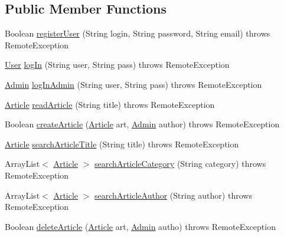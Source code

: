 \subsection*{Public Member Functions}
\begin{DoxyCompactItemize}
\item 
Boolean \hyperlink{interfacees_1_1deusto_1_1server_1_1_i_server_a3b0fbbc1c934b8e527ecfed69e497155}{register\+User} (String login, String password, String email)  throws Remote\+Exception
\item 
\hyperlink{classes_1_1deusto_1_1server_1_1jdo_1_1_user}{User} \hyperlink{interfacees_1_1deusto_1_1server_1_1_i_server_ae6b27c8714c2e2eadc9a55bccb0543fc}{log\+In} (String user, String pass)  throws Remote\+Exception
\item 
\hyperlink{classes_1_1deusto_1_1server_1_1jdo_1_1_admin}{Admin} \hyperlink{interfacees_1_1deusto_1_1server_1_1_i_server_a65588c309522410e6a6d9c27d80821a7}{log\+In\+Admin} (String user, String pass)  throws Remote\+Exception
\item 
\hyperlink{classes_1_1deusto_1_1server_1_1jdo_1_1_article}{Article} \hyperlink{interfacees_1_1deusto_1_1server_1_1_i_server_a1f02a5aa0628909b5464141923f5d1d2}{read\+Article} (String title)  throws Remote\+Exception
\item 
Boolean \hyperlink{interfacees_1_1deusto_1_1server_1_1_i_server_a74b3203c5a8d94e91004df0dc84ca386}{create\+Article} (\hyperlink{classes_1_1deusto_1_1server_1_1jdo_1_1_article}{Article} art, \hyperlink{classes_1_1deusto_1_1server_1_1jdo_1_1_admin}{Admin} author)  throws Remote\+Exception
\item 
\hyperlink{classes_1_1deusto_1_1server_1_1jdo_1_1_article}{Article} \hyperlink{interfacees_1_1deusto_1_1server_1_1_i_server_ab2c4bd97c628b735feedcf16e6aeb6b8}{search\+Article\+Title} (String title)  throws Remote\+Exception
\item 
Array\+List$<$ \hyperlink{classes_1_1deusto_1_1server_1_1jdo_1_1_article}{Article} $>$ \hyperlink{interfacees_1_1deusto_1_1server_1_1_i_server_ab08ccd2295e983571cf50431d273393a}{search\+Article\+Category} (String category)  throws Remote\+Exception
\item 
Array\+List$<$ \hyperlink{classes_1_1deusto_1_1server_1_1jdo_1_1_article}{Article} $>$ \hyperlink{interfacees_1_1deusto_1_1server_1_1_i_server_a92b587f25a7043b24d44f326d1c7b7ae}{search\+Article\+Author} (String author)  throws Remote\+Exception
\item 
Boolean \hyperlink{interfacees_1_1deusto_1_1server_1_1_i_server_ac96e072eb8a660ebcd5e535cb1324e64}{delete\+Article} (\hyperlink{classes_1_1deusto_1_1server_1_1jdo_1_1_article}{Article} art, \hyperlink{classes_1_1deusto_1_1server_1_1jdo_1_1_admin}{Admin} autho)  throws Remote\+Exception

\end{DoxyCompactItemize}
